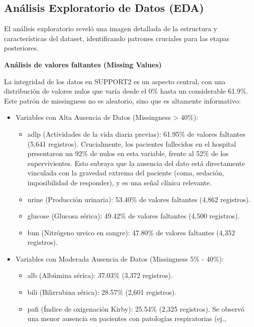 \subsection{Análisis Exploratorio de Datos (EDA)}

El análisis exploratorio reveló una imagen detallada de la estructura y
características del dataset, identificando patrones cruciales para las
etapas posteriores.

\textbf{Análisis de valores faltantes (Missing Values)}

La integridad de los datos en SUPPORT2 es un aspecto central, con una
distribución de valores nulos que varía desde el 0\% hasta un
considerable 61.9\%. Este patrón de missingness no es aleatorio, sino que es
altamente informativo:

\begin{itemize}
  \item Variables con Alta Ausencia de Datos (Missingness > 40\%):
    \begin{itemize}
      \item adlp (Actividades de la vida diaria previas): 61.95\% de valores
        faltantes (5,641 registros). Crucialmente, los pacientes fallecidos en
        el hospital presentaron un 92\% de nulos en esta variable, frente al 52\%
        de los supervivientes. Esto subraya que la ausencia del dato está
        directamente vinculada con la gravedad extrema del paciente (coma,
        sedación, imposibilidad de responder), y es una señal clínica relevante.
      \item urine (Producción urinaria): 53.40\% de valores faltantes (4,862
        registros).
      \item glucose (Glucosa sérica): 49.42\% de valores faltantes (4,500 registros).
      \item bun (Nitrógeno ureico en sangre): 47.80\% de valores faltantes (4,352
        registros).
    \end{itemize}
  \item Variables con Moderada Ausencia de Datos (Missingness 5\% - 40\%):
    \begin{itemize}
      \item alb (Albúmina sérica): 37.03\% (3,372 registros).
      \item bili (Bilirrubina sérica): 28.57\% (2,601 registros).
      \item pafi (Índice de oxigenación Kirby): 25.54\% (2,325 registros). Se observó
        una menor ausencia en pacientes con patologías respiratorias (ej.,

\end{itemize}
\end{itemize}
